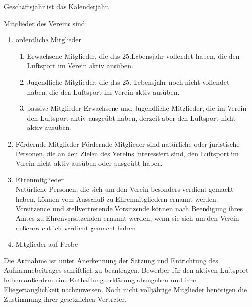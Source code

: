 \documentclass[10pt,a4paper,parskip=half]{scrartcl}
\begin{document}
\begin{contract}
\begin{multicols}{2}
    Geschäftsjahr ist das Kalenderjahr.
    
    \label{C:Mitglieder}
    
    Mitglieder des Vereins sind:
    \begin{enumerate}
      \item ordentliche Mitglieder
            \begin{enumerate}
              \item Erwachsene Mitglieder,
                    die das 25.Lebensjahr vollendet haben,
                    die den Luftsport im Verein aktiv
                    ausüben. \label{S:OrdentlicheMitglieder:Erwachsene}
              \item Jugendliche Mitglieder,
                    die das 25. Lebensjahr noch nicht vollendet haben,
                    die den Luftsport im Verein aktiv ausüben. \label{S:OrdentlicheMitglieder:Jugendliche}
              \item{passive Mitglieder} Erwachsene und Jugendliche Mitglieder,
                    die im Verein den Luftsport aktiv ausgeübt haben,
                    derzeit aber den Luftsport nicht aktiv ausüben.
            \end{enumerate}
      \item{Fördernde Mitglieder} Fördernde Mitglieder sind natürliche oder juristische Personen,
            die an den Zielen des Vereins interessiert sind,
            den Luftsport im Verein nicht aktiv ausüben oder ausgeübt haben.
            
      \item{Ehrenmitglieder}\\
            Natürliche Personen,
            die sich um den Verein besonders verdient gemacht haben,
            können vom Ausschuß zu Ehrenmitgliedern ernannt werden.
            Vorsitzende und stellvertretende Vorsitzende können nach Beendigung ihres Amtes zu Ehrenvorsitzenden ernannt werden,
            wenn sie sich um den Verein außerordentlich verdient gemacht haben.
      \item Mitglieder auf Probe
    \end{enumerate}\label{S:OrdentlicheMitglieder}
    
    
    Die Aufnahme ist unter Anerkennung der Satzung und Entrichtung des Aufnahmebeitrages schriftlich zu beantragen.
    Bewerber für den aktiven Luftsport haben außerdem eine Enthaftungserklärung abzugeben und ihre Fliegertauglichkeit nachzuweisen.
    Noch nicht volljährige Mitglieder benötigen die Zustimmung ihrer gesetzlichen Vertreter.
    

\end{multicols}
\end{contract}
\end{document}
